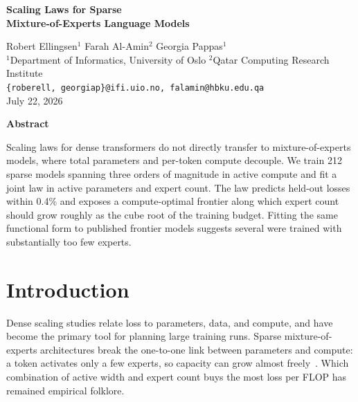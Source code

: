 \documentclass[11pt]{article}
\begin{document}

\begin{center}
  {\LARGE\bfseries Scaling Laws for Sparse\\[2pt] Mixture-of-Experts Language Models\par}
  \vskip 16pt
  {\large Robert Ellingsen$^{1}$ \quad Farah Al-Amin$^{2}$ \quad Georgia Pappas$^{1}$}\\[6pt]
  {\small $^{1}$Department of Informatics, University of Oslo \quad
          $^{2}$Qatar Computing Research Institute}\\[2pt]
  {\small\texttt{\{roberell, georgiap\}@ifi.uio.no, falamin@hbku.edu.qa}}\\[8pt]
  {\small July 22, 2026}
\end{center}

\vskip 14pt
\begin{center}{\bfseries Abstract}\end{center}
\begin{list}{}{\leftmargin=0.45in\rightmargin=0.45in}\item\relax
Scaling laws for dense transformers do not directly transfer to
mixture-of-experts models, where total parameters and per-token compute
decouple. We train 212 sparse models spanning three orders of magnitude in
active compute and fit a joint law in active parameters and expert count.
The law predicts held-out losses within 0.4\% and exposes a compute-optimal
frontier along which expert count should grow roughly as the cube root of
the training budget. Fitting the same functional form to published frontier
models suggests several were trained with substantially too few experts.
\end{list}
\vskip 8pt

\section{Introduction}
Dense scaling studies relate loss to parameters, data, and compute, and have
become the primary tool for planning large training runs. Sparse
mixture-of-experts architectures break the one-to-one link between
parameters and compute: a token activates only a few experts, so capacity
can grow almost freely~\cite{navarro2023moescale}. Which combination of
active width and expert count buys the most loss per FLOP has remained
empirical folklore.
\end{document}
